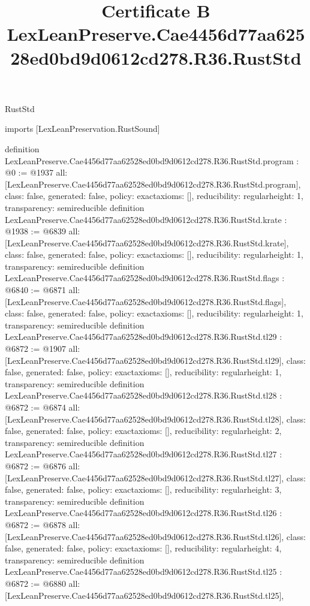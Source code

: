 \begin{lexlean}{RustStd}
\title{Certificate B LexLeanPreserve.Cae4456d77aa62528ed0bd9d0612cd278.R36.RustStd}
\begin{coremodule}
imports [LexLeanPreservation.RustSound]

definition LexLeanPreserve.Cae4456d77aa62528ed0bd9d0612cd278.R36.RustStd.program : @0 := @1937 {
  all: [LexLeanPreserve.Cae4456d77aa62528ed0bd9d0612cd278.R36.RustStd.program],
  class: false,
  generated: false,
  policy: exact{axioms: []},
  reducibility: regular{height: 1},
  transparency: semireducible
}
definition LexLeanPreserve.Cae4456d77aa62528ed0bd9d0612cd278.R36.RustStd.krate : @1938 := @6839 {
  all: [LexLeanPreserve.Cae4456d77aa62528ed0bd9d0612cd278.R36.RustStd.krate],
  class: false,
  generated: false,
  policy: exact{axioms: []},
  reducibility: regular{height: 1},
  transparency: semireducible
}
definition LexLeanPreserve.Cae4456d77aa62528ed0bd9d0612cd278.R36.RustStd.flags : @6840 := @6871 {
  all: [LexLeanPreserve.Cae4456d77aa62528ed0bd9d0612cd278.R36.RustStd.flags],
  class: false,
  generated: false,
  policy: exact{axioms: []},
  reducibility: regular{height: 1},
  transparency: semireducible
}
definition LexLeanPreserve.Cae4456d77aa62528ed0bd9d0612cd278.R36.RustStd.tl29 : @6872 := @1907 {
  all: [LexLeanPreserve.Cae4456d77aa62528ed0bd9d0612cd278.R36.RustStd.tl29],
  class: false,
  generated: false,
  policy: exact{axioms: []},
  reducibility: regular{height: 1},
  transparency: semireducible
}
definition LexLeanPreserve.Cae4456d77aa62528ed0bd9d0612cd278.R36.RustStd.tl28 : @6872 := @6874 {
  all: [LexLeanPreserve.Cae4456d77aa62528ed0bd9d0612cd278.R36.RustStd.tl28],
  class: false,
  generated: false,
  policy: exact{axioms: []},
  reducibility: regular{height: 2},
  transparency: semireducible
}
definition LexLeanPreserve.Cae4456d77aa62528ed0bd9d0612cd278.R36.RustStd.tl27 : @6872 := @6876 {
  all: [LexLeanPreserve.Cae4456d77aa62528ed0bd9d0612cd278.R36.RustStd.tl27],
  class: false,
  generated: false,
  policy: exact{axioms: []},
  reducibility: regular{height: 3},
  transparency: semireducible
}
definition LexLeanPreserve.Cae4456d77aa62528ed0bd9d0612cd278.R36.RustStd.tl26 : @6872 := @6878 {
  all: [LexLeanPreserve.Cae4456d77aa62528ed0bd9d0612cd278.R36.RustStd.tl26],
  class: false,
  generated: false,
  policy: exact{axioms: []},
  reducibility: regular{height: 4},
  transparency: semireducible
}
definition LexLeanPreserve.Cae4456d77aa62528ed0bd9d0612cd278.R36.RustStd.tl25 : @6872 := @6880 {
  all: [LexLeanPreserve.Cae4456d77aa62528ed0bd9d0612cd278.R36.RustStd.tl25],
}
\end{coremodule}
\end{lexlean}
